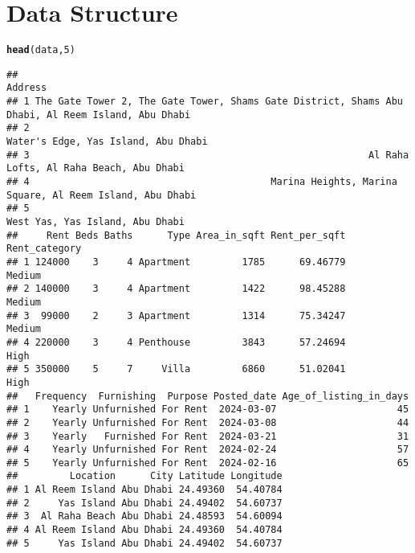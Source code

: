 \documentclass{article}\usepackage[]{graphicx}\usepackage[]{xcolor}
\makeatletter
\newcommand{\hlnum}[1]{\textcolor[rgb]{0.686,0.059,0.569}{#1}}%
\newcommand{\hlstd}[1]{\textcolor[rgb]{0.345,0.345,0.345}{#1}}%
\newcommand{\hlkwd}[1]{\textcolor[rgb]{0.737,0.353,0.396}{\textbf{#1}}}%
\newenvironment{kframe}{%
 \def\at@end@of@kframe{}%
 \ifinner\ifhmode%
  \def\at@end@of@kframe{\end{minipage}}%
  \begin{minipage}{\columnwidth}%
 \fi\fi%
 \def\FrameCommand##1{\hskip\@totalleftmargin \hskip-\fboxsep
 \colorbox{shadecolor}{##1}\hskip-\fboxsep
     \hskip-\linewidth \hskip-\@totalleftmargin \hskip\columnwidth}%
 \MakeFramed {\advance\hsize-\width
   \@totalleftmargin\z@ \linewidth\hsize
   \@setminipage}}%
 {\par\unskip\endMakeFramed%
 \at@end@of@kframe}
\newenvironment{knitrout}{}{} %
\makeatother
\begin{document}
\section{Data Structure}
\begin{knitrout}
\color{fgcolor}\begin{kframe}
\begin{alltt}
\hlkwd{head}\hlstd{(data,} \hlnum{5}\hlstd{)}
\end{alltt}
\begin{verbatim}
##                                                                                             Address
## 1 The Gate Tower 2, The Gate Tower, Shams Gate District, Shams Abu Dhabi, Al Reem Island, Abu Dhabi
## 2                                                               Water's Edge, Yas Island, Abu Dhabi
## 3                                                           Al Raha Lofts, Al Raha Beach, Abu Dhabi
## 4                                          Marina Heights, Marina Square, Al Reem Island, Abu Dhabi
## 5                                                                   West Yas, Yas Island, Abu Dhabi
##     Rent Beds Baths      Type Area_in_sqft Rent_per_sqft Rent_category
## 1 124000    3     4 Apartment         1785      69.46779        Medium
## 2 140000    3     4 Apartment         1422      98.45288        Medium
## 3  99000    2     3 Apartment         1314      75.34247        Medium
## 4 220000    3     4 Penthouse         3843      57.24694          High
## 5 350000    5     7     Villa         6860      51.02041          High
##   Frequency  Furnishing  Purpose Posted_date Age_of_listing_in_days
## 1    Yearly Unfurnished For Rent  2024-03-07                     45
## 2    Yearly Unfurnished For Rent  2024-03-08                     44
## 3    Yearly   Furnished For Rent  2024-03-21                     31
## 4    Yearly Unfurnished For Rent  2024-02-24                     57
## 5    Yearly Unfurnished For Rent  2024-02-16                     65
##         Location      City Latitude Longitude
## 1 Al Reem Island Abu Dhabi 24.49360  54.40784
## 2     Yas Island Abu Dhabi 24.49402  54.60737
## 3  Al Raha Beach Abu Dhabi 24.48593  54.60094
## 4 Al Reem Island Abu Dhabi 24.49360  54.40784
## 5     Yas Island Abu Dhabi 24.49402  54.60737
\end{verbatim}
\end{kframe}
\end{knitrout}
\end{document}
